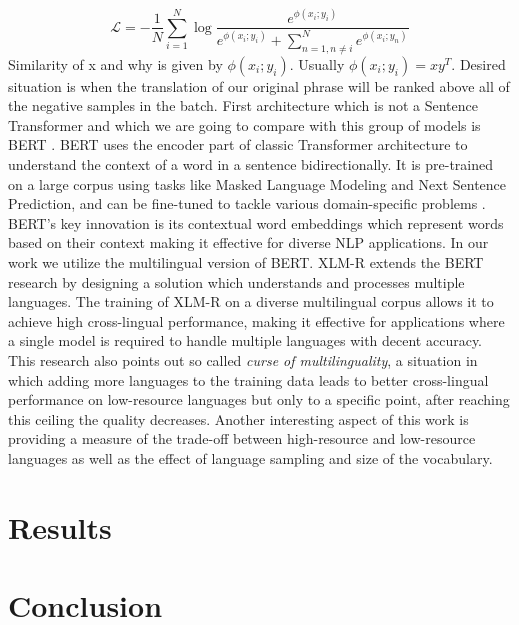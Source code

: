 \documentclass[12pt]{report}
\begin{document}
\begin{equation}
\mathcal{L} = -\frac{1}{N} \sum_{i=1}^{N} \log \frac{e^{\phi(x_i; y_i)}}{e^{\phi(x_i; y_i)} + \sum_{n=1, n \neq i}^{N} e^{\phi(x_i; y_n)}} 
\end{equation}
\newline
Similarity of x and why is given by $\phi(x_i; y_i)$. Usually $\phi(x_i; y_i) = xy^T$. Desired situation is when the translation of our original phrase will be ranked above all of the negative samples in the batch.
\newline \newline
First architecture which is not a Sentence Transformer and which we are going to compare with this group of models is BERT \cite{devlin2019bert}. BERT uses the encoder part of classic Transformer architecture to understand the context of a word in a sentence bidirectionally. It is pre-trained on a large corpus using tasks like Masked Language Modeling and Next Sentence Prediction, and can be fine-tuned to tackle various domain-specific problems . BERT's key innovation is its contextual word embeddings which represent words based on their context making it effective for diverse NLP applications. In our work we utilize the multilingual version of BERT.
\newline \newline
XLM-R \cite{xlm-r} extends the BERT research by designing a solution which understands and processes multiple languages. The training of XLM-R on a diverse multilingual corpus allows it to achieve high cross-lingual performance, making it effective for applications where a single model is required to handle multiple languages with decent accuracy. This research also points out so called \textit {curse of multilinguality}, a situation in which adding more languages to the training data leads to better cross-lingual performance on low-resource languages but only to a specific point, after reaching this ceiling the quality decreases. Another interesting aspect of this work is providing a measure of the trade-off between high-resource and low-resource languages as well as the effect of language sampling and size of the vocabulary.

\chapter{Results}
\label{chapter:results}


\chapter{Conclusion}
\label{chapter:conclusion}




\appendix
\end{document}
